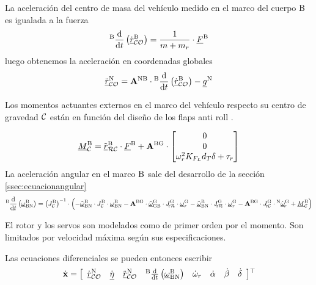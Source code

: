 La aceleración del centro de masa del vehículo medido en el marco del cuerpo $\mathrm{B}$ es igualada a la fuerza
\begin{equation}
	{}^{\mathrm{B}}\frac{\textrm{d} }{\textrm{d} t}\left( \dot{{ \underline{r} }}_{\mathcal{CO}}^{\mathrm{B}} \right) = \frac{1}{m+m_r} \cdot { \underline{F} }^{\mathrm{B}}
\end{equation}
luego obtenemos la aceleración en coordenadas globales
\begin{equation}
	\ddot{{ \underline{r} }}_{\mathcal{CO}}^{\mathrm{N}} =
	\mathbf{A}^{\mathrm{NB}}\cdot {}^{\mathrm{B}}\frac{\textrm{d} }{\textrm{d} t}\left( \dot{{ \underline{r} }}_{\mathcal{CO}}^{\mathrm{B}} \right)- { \underline{g} }^{\mathrm{N}}
\end{equation}

Los momentos actuantes externos en el marco del vehículo respecto su centro de gravedad $\mathcal{C}$ están en función del diseño de los flaps anti roll \cite{romarowski2020edf}.

\begin{equation}
	{ \underline{M} }^{\mathrm{B}}_{\mathcal{C}} = \tilde{{ \underline{r} }}_{\mathcal{RC}}^{\mathrm{B}}\cdot { \underline{F} }^{\mathrm{B}} + \mathbf{A}^{\mathrm{BG}} \cdot 
	\begin{bmatrix}
		0 \\
		0 \\
		\omega_r^2 K_{F_L}d_T\delta+\tau_r
	\end{bmatrix}  
\end{equation}
%
La aceleración angular en el marco $\mathrm{B}$ sale del desarrollo de la sección \ref{ssec:ecuacionangular}
\begin{equation}
{}^{\mathrm{B}}\frac{\textrm{d} }{\textrm{d} t} \left({ \underline{\omega} }_{\mathrm{BN}}^{\mathrm{B}} \right) =  \left(J_{\mathcal{C}}^{\mathrm{B}}\right)^{-1} \cdot \left( - \tilde{{ \underline{\omega} }}_{\mathrm{BN}}^{\mathrm{B}} \cdot J_{\mathcal{C}}^{\mathrm{B}}\cdot { \underline{\omega} }_{\mathrm{BN}}^{\mathrm{B}} - 
\mathbf{A}^{\mathrm{{BG}}} \cdot\tilde{{ \underline{\omega} }}_{\mathrm{GB}}^{\mathrm{G}} \cdot J_{\mathcal{\!\mathrm{r}R}}^{\mathrm{G}}  \cdot { \underline{\omega} }_r^{\mathrm{G}} -
\tilde{{ \underline{\omega} }}_{\mathrm{BN}}^{\mathrm{B}} \cdot J_{\mathcal{\!\mathrm{r}R}}^{\mathrm{G}}  \cdot { \underline{\omega} }_r^{\mathrm{G}} -
\mathbf{A}^{\mathrm{{BG}}}\cdot  J_{\mathcal{\!\mathrm{r}C}}^{\mathrm{G}} \cdot  {}^{\mathrm{N}} \dot{{ \underline{\omega} }}_{\!r}^{\mathrm{G}} + { \underline{M} }_{\mathcal{C}}^{\mathrm{B}} \right)
\end{equation}

El rotor y los servos son modelados como de primer orden por el momento. Son limitados por velocidad máxima según sus especificaciones.

Las ecuaciones diferenciales se pueden entonces escribir
\begin{equation} \label{eq:ssDiffVariables3D}
	\dot{\mathbf{x}} = \left[
	\begin{array}{cccccccc}
		\dot{{ \underline{r} }}_{\mathcal{CO}}^{\mathrm{N}}& \dot{{ \underline{\eta} }} &\ddot{{ \underline{r} }}_{\mathcal{CO}}^{\mathrm{N}} & {}^{\mathrm{B}}\frac{\textrm{d} }{\textrm{d} t} \left({ \underline{\omega} }_{\mathrm{BN}}^{\mathrm{B}} \right) & \dot{\omega}_r & \dot{\alpha} & \dot{\beta} & \dot{\delta}
	\end{array}\right] \!^{\top}\!
\end{equation}

